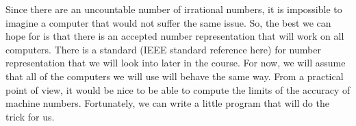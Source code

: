 \documentclass[10pt,fleqn]{article}
\begin{document}
Since there are an uncountable number of irrational numbers, it is impossible to
imagine a computer that would not suffer the same issue. So, the best we can
hope for is that there is an accepted number representation that will work on
all computers. There is a standard (IEEE standard reference here) for number
representation that we will look into later in the course. For now, we will
assume that all of the computers we will use will behave the same way. From a
practical point of view, it would be nice to be able to compute the limits of
the accuracy of machine numbers. Fortunately, we can write a little program that
will do the trick for us.
\end{document}
